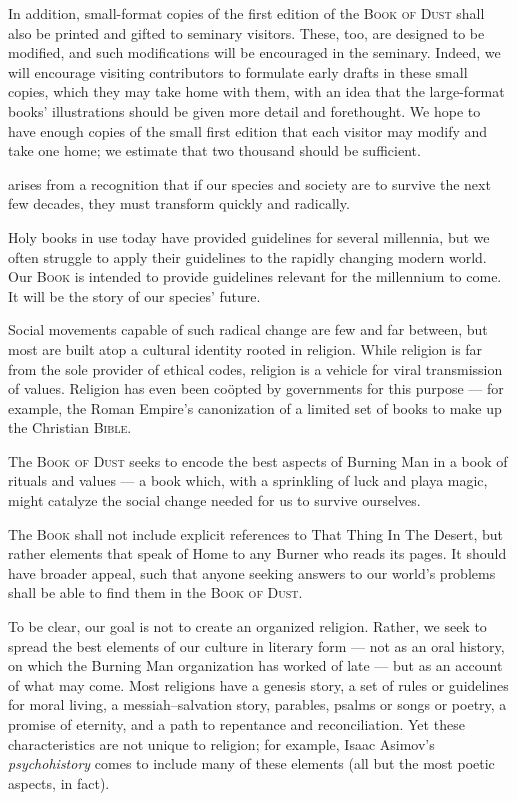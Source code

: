 \vv In addition, small-format copies of the first edition of the \textsc{Book of Dust} shall also be printed and gifted to seminary visitors.
\vv These, too, are designed to be modified, and such modifications will be encouraged in the seminary.
\vv Indeed, we will encourage visiting contributors to formulate early drafts in these small copies, which they may take home with them, with an idea that the large-format books' illustrations should be given more detail and forethought.
\vv We hope to have enough copies of the small first edition that each visitor may modify and take one home;
\vv we estimate that two thousand should be sufficient.

 arises from a recognition that if our species and society are to survive the next few decades, they must transform quickly and radically.\footnotemarkmain{}

\vv Holy books in use today have provided guidelines for several millennia, but we often struggle to apply their guidelines to the rapidly changing modern world.
\vv Our \textsc{Book} is intended to provide guidelines relevant for the millennium to come.
\vv It will be the story of our species' future.

\vv Social movements capable of such radical change are few and far between, but most are built atop a cultural identity rooted in religion.
\vv While religion is far from the sole provider of ethical codes, religion is a vehicle for viral transmission of values.
\vv Religion has even been co\"opted by governments for this purpose --- for example, the Roman Empire's canonization of a limited set of books to make up the Christian \textsc{Bible}.

\vv The \textsc{Book of Dust} seeks to encode the best aspects of Burning Man in a book of rituals and values --- a book which, with a sprinkling of luck and playa magic, might catalyze the social change needed for us to survive ourselves.

\vv The \textsc{Book} shall not include explicit references to That Thing In The Desert, but rather elements that speak of Home to any Burner who reads its pages.
\vv It should have broader appeal, such that anyone seeking answers to our world's problems shall be able to find them in the \textsc{Book of Dust}.

\vv To be clear, our goal is not to create an organized religion.
\vv Rather, we seek to spread the best elements of our culture in literary form --- not as an oral history, on which the Burning Man organization has worked of late --- but as an account of what may come. \vv Most religions have a genesis story, a set of rules or guidelines for moral living, a messiah--salvation story, parables, psalms or songs or poetry, a promise of eternity, and a path to repentance and reconciliation.
\vv Yet these characteristics are not unique to religion; for example, Isaac Asimov's \textit{psychohistory} comes to include many of these elements (all but the most poetic aspects, in fact).

